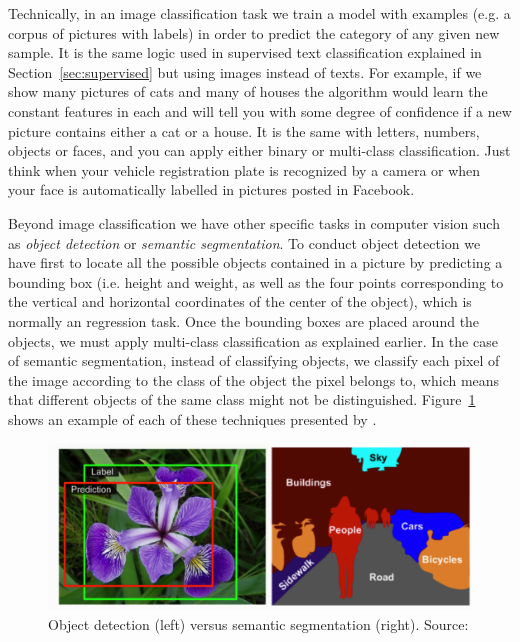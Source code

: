 Technically, in an image classification task we train a model with examples (e.g. a corpus of pictures with labels) in order to predict the category of any given new sample. It is the same logic used in supervised text classification  explained in Section~\ref{sec:supervised} but using images instead of texts. For example, if we show many pictures of cats and many of houses the algorithm would learn the constant features in each and will tell you with some degree of confidence if a new picture contains either a cat or a house. It is the same with letters, numbers, objects or faces, and you can apply either binary or multi-class classification. Just think when your vehicle registration plate is recognized by a camera or when your face is automatically labelled in pictures posted in Facebook.

Beyond image classification we have other specific tasks in computer vision such as \textit{object detection} or \textit{semantic segmentation}. To conduct object detection we have first to locate all the possible objects contained in a picture by predicting a bounding box (i.e. height and weight, as well as the four points corresponding to the vertical and horizontal coordinates of the center of the object), which is normally an regression task. Once the bounding boxes are placed around the objects, we must apply multi-class classification as explained earlier. In the case of semantic segmentation, instead of classifying objects, we classify each pixel of the image according to the class of the object the pixel belongs to, which means that different objects of the same class might not be distinguished. Figure~\ref{fig:location} shows an example of each of these techniques presented by \citet{geron2019hands}.

\begin{figure}
\centering
\includegraphics[width=0.9\linewidth]{figures/ch15_location.png}
\caption{Object detection (left) versus semantic segmentation (right).
Source: \citet{geron2019hands}}
\label{fig:location}
\end{figure}

